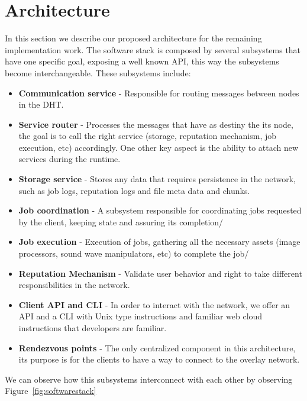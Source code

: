 
% 
% 

\section{Architecture}

In this section we describe our proposed architecture for the remaining implementation work. The software stack is composed by several subsystems that have one specific goal, exposing a well known API, this way the subsystems become interchangeable. These subsystems include:

\begin{itemize}
  \item \textbf{Communication service} - Responsible for routing messages between nodes in the DHT.
  \item \textbf{Service router} - Processes the messages that have as destiny the its node, the goal is to call the right service (storage, reputation mechanism, job execution, etc) accordingly. One other key aspect is the ability to attach new services during the runtime.
  \item \textbf{Storage service} - Stores any data that requires persistence in the network, such as job logs, reputation logs and file meta data and chunks.
  \item \textbf{Job coordination} - A subsystem responsible for coordinating jobs requested by the client, keeping state and assuring its completion/
  \item \textbf{Job execution} - Execution of jobs, gathering all the necessary assets (image processors, sound wave manipulators, etc) to complete the job/
  \item \textbf{Reputation Mechanism} - Validate user behavior and right to take different responsibilities in the network.
  \item \textbf{Client API and CLI} - In order to interact with the network, we offer an API and a CLI with Unix type instructions and familiar web cloud instructions that developers are familiar.
  \item \textbf{Rendezvous points} - The only centralized component in this architecture, its purpose is for the clients to have a way to connect to the overlay network. 
\end{itemize}

We can observe how this subsystems interconnect with each other by observing Figure~\ref{fig:softwarestack}


